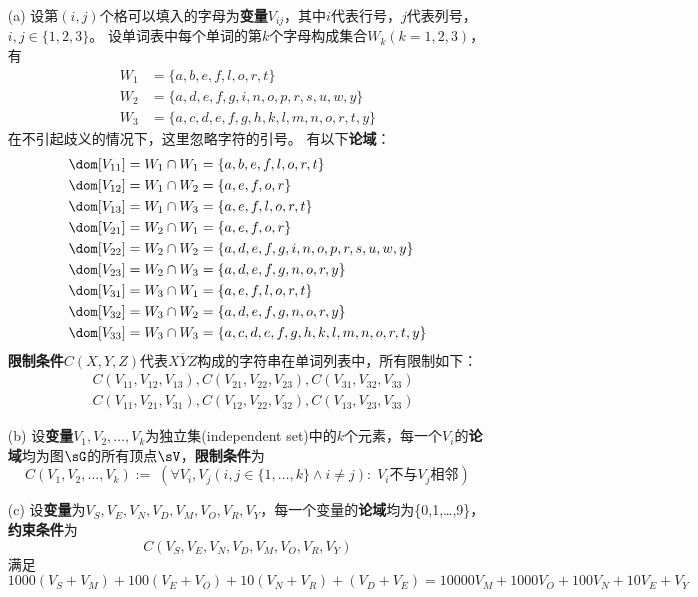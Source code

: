 \documentclass[a4paper, 11pt]{article}
\begin{document}
\begin{answer}
\begin{itemize}
\item [(a)] 设第$(i,j)$个格可以填入的字母为\textbf{变量}$V_{ij}$，其中$i$代表行号，$j$代表列号，$i,j\in\{1,2,3\}$。
设单词表中每个单词的第$k$个字母构成集合$W_k(k=1,2,3)$，有
\[\begin{aligned}
    W_1 &= \{a,b,e,f,l,o,r,t\}\\
    W_2 &= \{a,d,e,f,g,i,n,o,p,r,s,u,w,y\}\\
    W_3 &= \{a,c,d,e,f,g,h,k,l,m,n,o,r,t,y\}
\end{aligned}\]
在不引起歧义的情况下，这里忽略字符的引号。
有以下\textbf{论域}：
\[\begin{aligned}
\dom[V_{11}] &= W_1\cap W_1 = \{a,b,e,f,l,o,r,t\}\\
\dom[V_{12}] &= W_1\cap W_2 = \{a,e,f,o,r\}\\
\dom[V_{13}] &= W_1\cap W_3 = \{a,e,f,l,o,r,t\}\\
\dom[V_{21}] &= W_2\cap W_1 = \{a,e,f,o,r\}\\
\dom[V_{22}] &= W_2\cap W_2 = \{a,d,e,f,g,i,n,o,p,r,s,u,w,y\}\\
\dom[V_{23}] &= W_2\cap W_3 = \{a,d,e,f,g,n,o,r,y\}\\
\dom[V_{31}] &= W_3\cap W_1 = \{a,e,f,l,o,r,t\}\\
\dom[V_{32}] &= W_3\cap W_2 = \{a,d,e,f,g,n,o,r,y\}\\
\dom[V_{33}] &= W_3\cap W_3 = \{a,c,d,e,f,g,h,k,l,m,n,o,r,t,y\}
\end{aligned}\]
\textbf{限制条件}$C(X,Y,Z)$代表$\overline{XYZ}$构成的字符串在单词列表中，所有限制如下：
\[\begin{aligned}
    & C(V_{11},V_{12},V_{13}),C(V_{21},V_{22},V_{23}),C(V_{31},V_{32},V_{33})\\
    & C(V_{11},V_{21},V_{31}),C(V_{12},V_{22},V_{32}),C(V_{13},V_{23},V_{33})
\end{aligned}\]

\item [(b)] 设\textbf{变量}$V_1,V_2,\ldots,V_k$为独立集(independent set)中的$k$个元素，每一个$V_i$的\textbf{论域}均为图$\sG$的所有顶点$\sV$，\textbf{限制条件}为
\[C(V_1,V_2,\ldots,V_k):=\;(\forall V_i,V_j(i,j\in\{1,\ldots,k\}\land i\ne j):\;V_i\text{不与}V_j\text{相邻})\]

\item [(c)] 设\textbf{变量}为$V_S,V_E,V_N,V_D,V_M,V_O,V_R,V_Y$，每一个变量的\textbf{论域}均为\{0,1,\ldots,9\}，\textbf{约束条件}为
\[C(V_S,V_E,V_N,V_D,V_M,V_O,V_R,V_Y)\]
满足
\[1000(V_S+V_M)+100(V_E+V_O)+10(V_N+V_R)+(V_D+V_E)=10000V_M+1000V_O+100V_N+10V_E+V_Y\]
\end{itemize}
\end{answer}
\begin{flushleft}
\end{flushleft}
\end{document}

